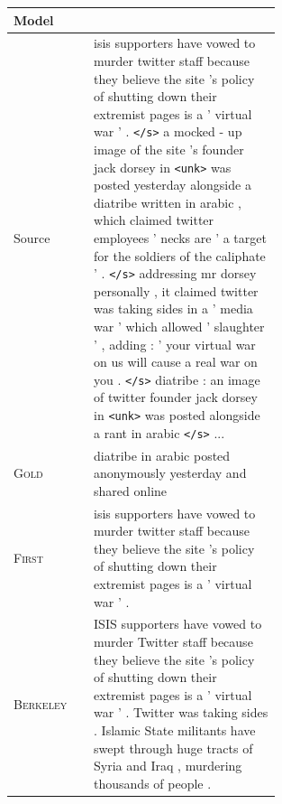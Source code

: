 \documentclass[12pt]{report}
\begin{document}
\begin{figure}[p]
\centering
\begin{tabular}{ll p{0.7\linewidth}}
\toprule
Model & & \\
\midrule
Source & & isis supporters have vowed to murder twitter staff because they believe the site 's policy of shutting down their extremist pages is a ' virtual
war ' . \texttt{</s>} a mocked - up image of the site 's founder jack dorsey in \texttt{<unk>} was posted yesterday alongside a diatribe written in arabic , which claimed twitter employees ' necks
 are ' a target for the soldiers of the caliphate ' . \texttt{</s>} addressing mr dorsey personally , it claimed twitter was taking sides in a ' media war ' which allowed ' slaughter ' ,
adding : ' your virtual war on us will cause a real war on you . \texttt{</s>} diatribe : an image of twitter founder jack dorsey in \texttt{<unk>} was posted alongside a rant in arabic \texttt{</s>} ... \\
\midrule
\textsc{Gold} & & diatribe in arabic posted anonymously yesterday and shared online \\
\midrule
\textsc{First} & &  isis supporters have vowed to murder twitter staff because they believe the site 's policy of shutting down their extremist pages is a ' virtual
war ' . \\
 \midrule
\textsc{Berkeley} & & ISIS supporters have vowed to murder Twitter staff because they believe the site 's policy of shutting down their extremist pages is a ' virtual war ' .
Twitter was taking sides .
Islamic State militants have swept through huge tracts of Syria and Iraq , murdering thousands of people .\\
\midrule


\end{tabular}
\end{figure}
\end{document}
